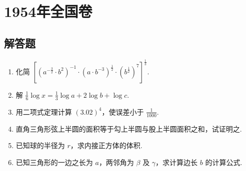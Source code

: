 \chapter{1954年全国卷}

\section{解答题}

\begin{problem}
\begin{enumerate}
\item 化简 \(\left[\left(a^{-\frac{3}{2}}\cdot b^{2}\right)^{-1}\cdot\left(a\cdot b^{-3}\right)^{\frac{1}{2}}\cdot\left(b^{\frac{1}{2}}\right)^{7}\right]^{\frac{1}{3}}\).
\item 解 \(\frac{1}{6}\log x=\frac{1}{3}\log a+2\log b+\log c\).
\item 用二项式定理计算 \(\left(3.02\right)^{4}\)，使误差小于 \(\frac{1}{1000}\).
\item 直角三角形弦上半圆的面积等于勾上半圆与股上半圆面积之和，试证明之.
\item 已知球的半径为 \(r\)，求内接正方体的体积.
\item 已知三角形的一边之长为 \(a\)，两邻角为 \(\beta\) 及 \(\gamma\)，求计算边长 \(b\) 的计算公式.
\end{enumerate}
\end{problem}

